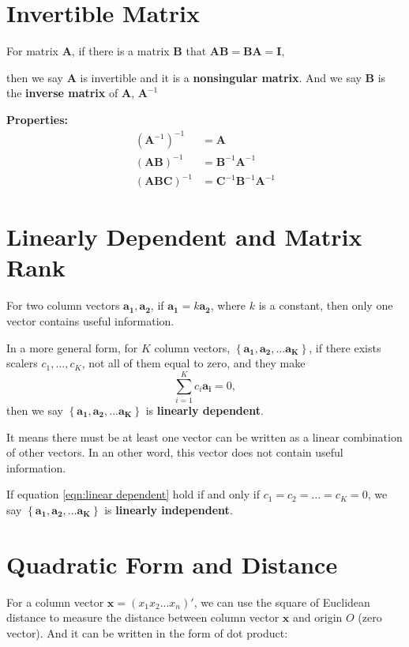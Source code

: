 \documentclass[12pt]{article}
\begin{document}
\section{Invertible Matrix}
For matrix $ \bm{A} $, if there is a matrix $ \bm{B} $ that
$ \bm{AB} = \bm{BA} = \bm{I} $, 

then we say $ \bm{A} $ is invertible and it is a {\textbf {nonsingular matrix}}.
And we say $ \bm{B} $ is the {\textbf {inverse matrix}} of $ \bm{A} $, $ \bm{A}^{ - 1} $

{\textbf {Properties:}}
\begin{align*}
(\bm{A}^{ - 1})^{ - 1} &= \bm{A}\\
(\bm{AB})^{ - 1} &= \bm{B}^{ - 1}\bm{A}^{ - 1}\\
(\bm{ABC})^{ - 1}&= \bm{C}^{ - 1}\bm{B}^{ - 1}\bm{A}^{ - 1}
\end{align*}



\section{Linearly Dependent and Matrix Rank}
For two column vectors $ \bm{a_1}, \bm{a_2} $, if $ \bm{a_1} = k \bm{a_2} $, where
$ k $ is a constant, then only one vector contains useful information.

In a more general form, for $ K $ column vectors, $ \left\{ \bm{a_1}, \bm{a_2}, 
... \bm{a_{K}}\right\}  $, if there exists scalers $ c_1, ..., c_{K} $, not all of
them equal to zero, and they make
\begin{equation}
		\label{eqn:linear dependent}
		\sum\limits_{i = 1} ^K c_{i}\bm{a_{i}}	=0,
\end{equation}
then we say $ \left\{ \bm{a_1}, \bm{a_2}, ... \bm{a_{K}}\right\}  $ is 
{\textbf {linearly dependent}}.

It means there must be at least one vector can be written as a linear combination of
other vectors. In an other word, this vector does not contain useful information.

If equation \eqref{eqn:linear dependent} hold if and only if $ c_1 = c_2 = ... = c_{K} =
0 $, we say $ \left\{ \bm{a_1}, \bm{a_2}, ... \bm{a_{K}}\right\}  $ is 
{\textbf {linearly independent}}.




\section{Quadratic Form and Distance}
For a column vector $ \bm{x} = (x_1 x_2 ... x_{n})' $, we can use the square of 
Euclidean distance to measure the distance between column vector $ \bm{x} $ and 
origin $ O $ (zero vector). And it can be written in the form of dot product:
\end{document}
